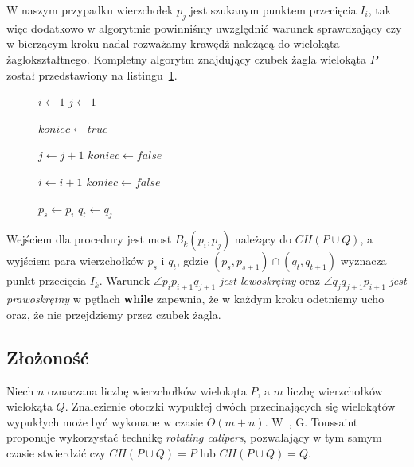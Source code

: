 W naszym przypadku wierzchołek $p_j$ jest szukanym punktem przecięcia
$I_i$, tak więc dodatkowo w algorytmie powinniśmy uwzględnić warunek
sprawdzający czy w bierzącym kroku nadal rozważamy krawędź należącą do
wielokąta żaglokształtnego. Kompletny algorytm znajdujący czubek żagla
wielokąta $P$ został przedstawiony na listingu~\ref{alg:stepdown}.

\begin{figure}[htp]
\begin{algorithmic}[1]

\State $i \gets 1$
\State $j \gets 1$


\Repeat
\State $koniec \gets true$


\State $j \gets j + 1$
\State $koniec \gets false$
\EndWhile


\State $i \gets i + 1$
\State $koniec \gets false$
\EndWhile



\State $p_s \gets p_i$
\State $q_t \gets q_j$

\EndProcedure
\end{algorithmic}
\caption{\label{alg:stepdown}}
\end{figure}

Wejściem dla procedury jest most $B_k(p_i,p_j)$ należący do $CH(P \cup
Q)$, a wyjściem para wierzchołków $p_s$ i $q_t$, gdzie $(p_s,p_{s+1})
\cap (q_t,q_{t+1})$ wyznacza punkt przecięcia $I_k$. Warunek $\angle
p_{i}p_{i+1}q_{j+1}$ \emph{jest lewoskrętny} oraz $\angle
q_{j}q_{j+1}p_{i+1}$ \emph{jest prawoskrętny} w pętlach \textbf{while}
zapewnia, że w każdym kroku odetniemy ucho oraz, że nie przejdziemy
przez czubek żagla.

\subsection{Złożoność}
Niech $n$ oznaczana liczbę wierzchołków wielokąta $P$, a $m$ liczbę
wierzchołków wielokąta $Q$. Znalezienie otoczki wypukłej dwóch
przecinających się wielokątów wypukłych może być wykonane w czasie
$O(m + n)$\cite{Toussaint83}. W~\cite{ToussaintInt}, G. Toussaint
proponuje wykorzystać technikę \emph{rotating calipers}, pozwalający
w tym samym czasie stwierdzić czy $CH(P \cup Q) = P$ lub $CH(P \cup Q)
= Q$.

